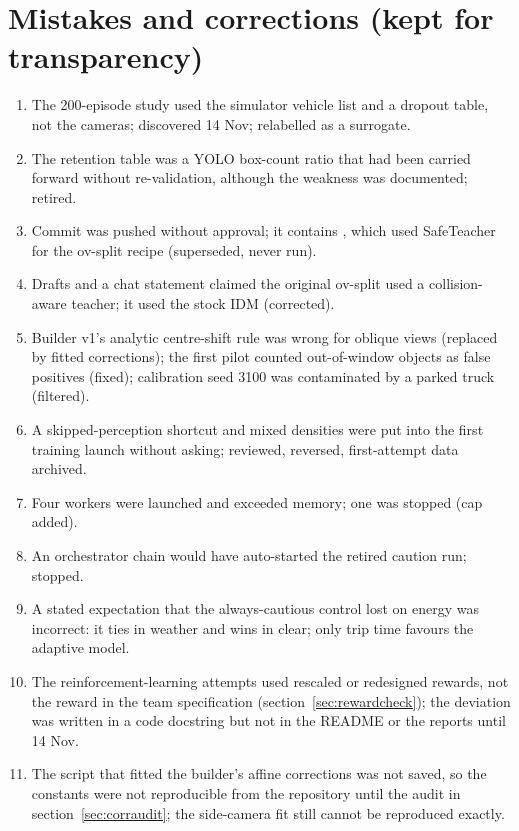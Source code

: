 \documentclass[10.5pt,a4paper]{article}
\newcommand{\code}[1]{\texttt{\detokenize{#1}}}
\begin{document}
\section{Mistakes and corrections (kept for transparency)}
\begin{enumerate}[leftmargin=*]
\item The 200-episode study used the simulator vehicle list and a dropout table, not the cameras; discovered 14 Nov; relabelled as a surrogate.
\item The retention table was a YOLO box-count ratio that had been carried forward without re-validation, although the weakness was documented; retired.
\item Commit \code{4d45920} was pushed without approval; it contains \code{e2e_dagger.py}, which used SafeTeacher for the ov-split recipe (superseded, never run).
\item Drafts and a chat statement claimed the original ov-split used a collision-aware teacher; it used the stock IDM (corrected).
\item Builder v1's analytic centre-shift rule was wrong for oblique views (replaced by fitted corrections); the first pilot counted out-of-window objects as false positives (fixed); calibration seed 3100 was contaminated by a parked truck (filtered).
\item A skipped-perception shortcut and mixed densities were put into the first training launch without asking; reviewed, reversed, first-attempt data archived.
\item Four workers were launched and exceeded memory; one was stopped (cap added).
\item An orchestrator chain would have auto-started the retired caution run; stopped.
\item A stated expectation that the always-cautious control lost on energy was incorrect: it ties in weather and wins in clear; only trip time favours the adaptive model.
\item The reinforcement-learning attempts used rescaled or redesigned rewards, not the reward in the team specification (section~\ref{sec:rewardcheck}); the deviation was written in a code docstring but not in the README or the reports until 14 Nov.
\item The script that fitted the builder's affine corrections was not saved, so the constants were not reproducible from the repository until the audit in section~\ref{sec:corraudit}; the side-camera fit still cannot be reproduced exactly.
\end{enumerate}
\end{document}
